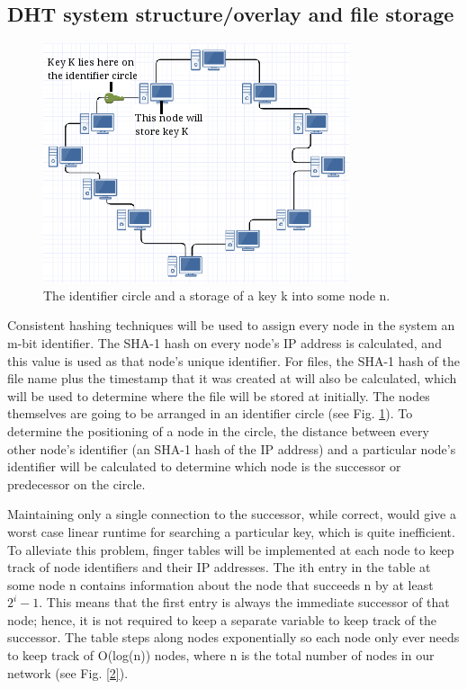 \documentclass[fleqn,24pt]{SelfArx} %
\begin{document}
\subsection{DHT system structure/overlay and file storage}

\begin{figure}
\includegraphics{Selection_152.png}
\caption{\label{family}The identifier circle and a storage of a key k into some node n.}
\label{1}
\end{figure}

Consistent hashing techniques will be used to assign every node in the system an m-bit identifier. The SHA-1 hash on every node’s IP address is calculated, and this value is used as that node's unique identifier. For files, the SHA-1 hash of the file name plus the timestamp that it was created at will also be calculated, which will be used to determine where the file will be stored at initially. The nodes themselves are going to be arranged in an identifier circle (see Fig. \ref{1}). To determine the positioning of a node in the circle, the distance between every other node's identifier (an SHA-1 hash of the IP address) and a particular node's identifier will be calculated to determine which node is the successor or predecessor on the circle.   

Maintaining only a single connection to the successor, while correct, would give a worst case linear runtime for searching a particular key, which is quite inefficient. To alleviate this problem, finger tables \cite{1} will be implemented at each node to keep track of node identifiers and their IP addresses. The ith entry in the table at some node n contains information about the node that succeeds n by at least $2^i - 1$. This means that the first entry is always the immediate successor of that node; hence, it is not required to keep a separate variable to keep track of the successor. The table steps along nodes exponentially so each node only ever needs to keep track of O(log(n)) nodes, where n is the total number of nodes in our network (see Fig. \ref{2}).
\end{document}
